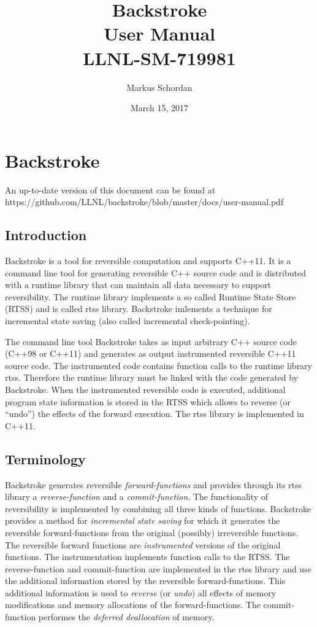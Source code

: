 \documentclass[english,12pt, titlepage]{article}      %
\title{Backstroke \bslongversion\\User Manual\\{\footnotesize LLNL-SM-719981}}  %
\author{Markus Schordan} %
\date{March 15, 2017} %
\newcommand{\forwardfunctions}{forward-functions}
\newcommand{\reversefunction}{reverse-function}
\newcommand{\commitfunction}{commit-function}
\begin{document}
\maketitle
\tableofcontents        
\afterpage{\clearpage}

\section{Backstroke}

An up-to-date version of this document can be found at
{\normalsize https://github.com/LLNL/backstroke/blob/master/docs/user-manual.pdf}

\subsection{Introduction}
Backstroke is a tool for reversible computation and supports C++11. It
is a command line tool for generating reversible C++ source code and
is distributed with a runtime library that can maintain all data
necessary to support reversibility. The runtime library implements a
so called Runtime State Store (RTSS) and is called rtss
library. Backstroke imlements a technique for incremental state saving
(also called incremental check-pointing).

The command line tool Backstroke takes as input arbitrary C++ source
code (C++98 or C++11) and generates as output instrumented reversible
C++11 source code. The instrumented code contains function calls to
the runtime library rtss. Therefore the runtime library must be linked
with the code generated by Backstroke. When the instrumented
reversible code is executed, additional program state information is
stored in the RTSS which allows to reverse (or ``undo'') the effects
of the forward execution. The rtss library is implemented in C++11.

\subsection{Terminology}

Backstroke generates reversible {\em \forwardfunctions{}} and provides
through its rtss library a {\em \reversefunction{}} and a {\em
  \commitfunction}. The functionality of reversibility is implemented
by combining all three kinds of functions. Backstroke provides a
method for {\em incremental state saving} for which it generates the
reversible \forwardfunctions{} from the original (possibly)
irreversible functions. The reversible forward functions are {\em
  instrumented} versions of the original functions. The
instrumentation implements function calls to the RTSS. The
\reversefunction{} and \commitfunction{} are implemented in the rtss
library and use the additional information stored by the reversible
\forwardfunctions. This additional information is used to {\em
  reverse} (or {\em undo}) all effects of memory modifications and
memory allocations of the \forwardfunctions. The commit-function
performes the {\em deferred deallocation} of memory.
\end{document}
